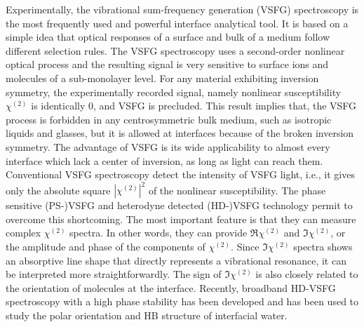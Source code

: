 Experimentally, the vibrational sum-frequency generation (VSFG) spectroscopy is the most frequently used and powerful interface analytical tool\cite{Shen2016,Morita2018,Shen2020}.
It is based on a simple idea that optical responses of a surface and bulk of a medium follow different selection rules.
The VSFG spectroscopy uses a second-order nonlinear optical process and the resulting signal is very sensitive to surface ions and 
molecules of a sub-monolayer level\cite{Morita2008,WangHongFei2015,WenYuChieh2016,Ishiyama2017,Penalber-Johnstone2018}. 
%
For any material exhibiting inversion symmetry, the experimentally recorded signal, namely nonlinear susceptibility $\chi^{(2)}$ is identically 0, and VSFG is precluded\cite{Franken1963}.
This result implies that, the VSFG process is forbidden in any centrosymmetric bulk medium\cite{CheM2012},
such as isotropic liquids and glasses, but it is allowed at interfaces because of the broken inversion symmetry\cite{PF00}.
The advantage of VSFG is its wide applicability to almost every interface which lack a center of inversion, as long as light can reach them. 
%
Conventional VSFG spectroscopy detect the intensity of VSFG light,
i.e., it gives only the absolute square $|\chi^{(2)}|^2$ of the nonlinear susceptibility\cite{ShenYR1984,Guyot-Sionnest1986,Shen2020}. 
The phase sensitive (PS-)VSFG\cite{JiN2008} and heterodyne detected (HD-)VSFG technology\cite{Stiopkin2008} permit to overcome this shortcoming. 
The most important feature is that they can measure complex $\chi^{(2)}$ spectra. 
In other words, they can provide $\Re \chi^{(2)}$ and $\Im \chi^{(2)}$, or the amplitude and phase of the components of $\chi^{(2)}$. 
Since $\Im \chi^{(2)}$ spectra shows an absorptive line shape that directly represents a vibrational resonance, 
it can be interpreted more straightforwardly\cite{Nihonyanagi2013}.
The sign of $\Im \chi^{(2)}$ is also closely related to the orientation of molecules at the interface\cite{TianCS2008,TianCS2009,TianCS2011}.
Recently, broadband HD-VSFG spectroscopy with a high phase stability has been developed and has been used to study the polar orientation and HB structure of interfacial
water\cite{Nihonyanagi2009,Shen2013}. 

